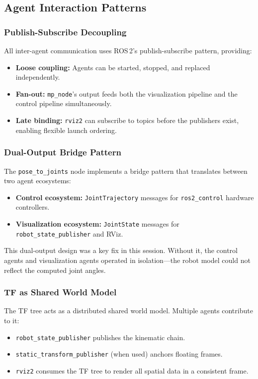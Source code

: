 \documentclass[11pt,a4paper]{article}
\begin{document}
\subsection{Agent Interaction Patterns}

\subsubsection{Publish-Subscribe Decoupling}

All inter-agent communication uses ROS\,2's publish-subscribe pattern, providing:
\begin{itemize}
    \item \textbf{Loose coupling:} Agents can be started, stopped, and replaced independently.
    \item \textbf{Fan-out:} \texttt{mp\_node}'s output feeds both the visualization pipeline and the control pipeline simultaneously.
    \item \textbf{Late binding:} \texttt{rviz2} can subscribe to topics before the publishers exist, enabling flexible launch ordering.
\end{itemize}

\subsubsection{Dual-Output Bridge Pattern}

The \texttt{pose\_to\_joints} node implements a bridge pattern that translates between two agent ecosystems:
\begin{itemize}
    \item \textbf{Control ecosystem:} \texttt{JointTrajectory} messages for \texttt{ros2\_control} hardware controllers.
    \item \textbf{Visualization ecosystem:} \texttt{JointState} messages for \texttt{robot\_state\_publisher} and RViz.
\end{itemize}

This dual-output design was a key fix in this session. Without it, the control agents and visualization agents operated in isolation---the robot model could not reflect the computed joint angles.

\subsubsection{TF as Shared World Model}

The TF tree acts as a distributed shared world model. Multiple agents contribute to it:
\begin{itemize}
    \item \texttt{robot\_state\_publisher} publishes the kinematic chain.
    \item \texttt{static\_transform\_publisher} (when used) anchors floating frames.
    \item \texttt{rviz2} consumes the TF tree to render all spatial data in a consistent frame.
\end{itemize}
\end{document}
